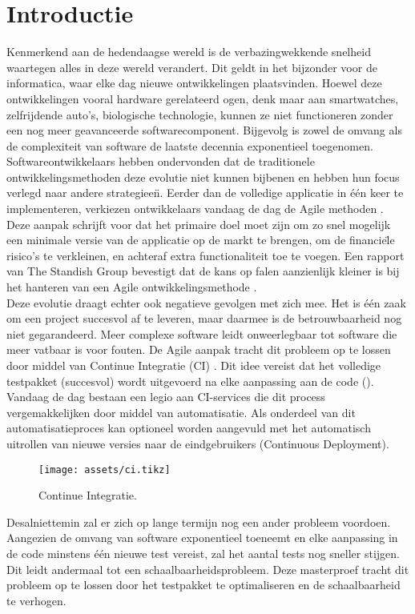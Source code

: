 
\section{Introductie}
\noindent Kenmerkend aan de hedendaagse wereld is de verbazingwekkende snelheid waartegen alles in deze wereld verandert. Dit geldt in het bijzonder voor de informatica, waar elke dag nieuwe ontwikkelingen plaatsvinden. Hoewel deze ontwikkelingen vooral hardware gerelateerd ogen, denk maar aan smartwatches, zelfrijdende auto's, biologische technologie, kunnen ze niet functioneren zonder een nog meer geavanceerde softwarecomponent. Bijgevolg is zowel de omvang als de complexiteit van software de laatste decennia exponentieel toegenomen.\\

\noindent Softwareontwikkelaars hebben ondervonden dat de traditionele ontwikkelingsmethoden deze evolutie niet kunnen bijbenen en hebben hun focus verlegd naar andere strategiee\"n. Eerder dan de volledige applicatie in één keer te implementeren, verkiezen ontwikkelaars vandaag de dag de Agile methoden \cite{beck2001agile}. Deze aanpak schrijft voor dat het primaire doel moet zijn om zo snel mogelijk een minimale versie van de applicatie op de markt te brengen, om de financie\"le risico's te verkleinen, en achteraf extra functionaliteit toe te voegen. Een rapport van The Standish Group bevestigt dat de kans op falen aanzienlijk kleiner is bij het hanteren van een Agile ontwikkelingsmethode \cite{standish2015chaos}.\\

\noindent Deze evolutie draagt echter ook negatieve gevolgen met zich mee. Het is één zaak om een project succesvol af te leveren, maar daarmee is de betrouwbaarheid nog niet gegarandeerd. Meer complexe software leidt onweerlegbaar tot software die meer vatbaar is voor fouten. De Agile aanpak tracht dit probleem op te lossen door middel van Continue Integratie (CI) \cite{SmartJenkinsDefinitive}. Dit idee vereist dat het volledige testpakket (succesvol) wordt uitgevoerd na elke aanpassing aan de code (). Vandaag de dag bestaan een legio aan CI-services die dit process vergemakkelijken door middel van automatisatie. Als onderdeel van dit automatisatieproces kan optioneel worden aangevuld met het automatisch uitrollen van nieuwe versies naar de eindgebruikers (Continuous Deployment).

\begin{figure}[h!]
	\centering
	\texttt{[image: assets/ci.tikz]}
	\caption{Continue Integratie.}
	\label{fig:ext-nl-ci}
\end{figure}

\noindent Desalniettemin zal er zich op lange termijn nog een ander probleem voordoen. Aangezien de omvang van software exponentieel toeneemt en elke aanpassing in de code minstens één nieuwe test vereist, zal het aantal tests nog sneller stijgen. Dit leidt andermaal tot een schaalbaarheidsprobleem. Deze masterproef tracht dit probleem op te lossen door het testpakket te optimaliseren en de schaalbaarheid te verhogen.\\